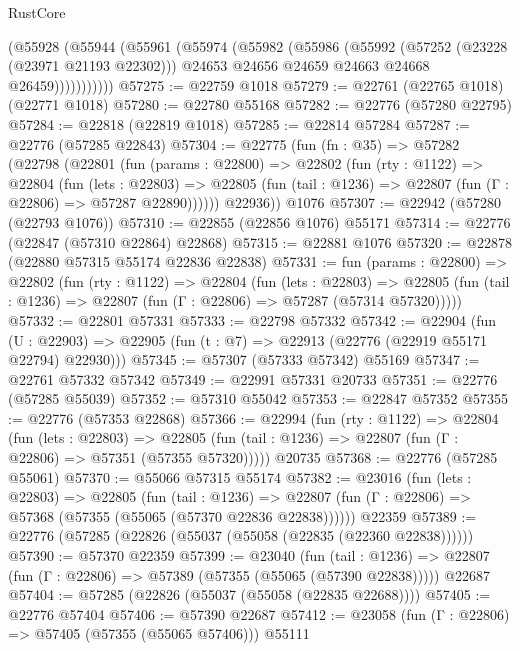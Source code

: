 \begin{lexlean}{RustCore}
\begin{coremodule}
            (@55928
              (@55944
                (@55961
                  (@55974
                    (@55982
                      (@55986
                        (@55992
                          (@57252 (@23228 (@23971 @21193 @22302)))
                          @24653
                          @24656
                          @24659
                          @24663
                          @24668
                          @26459)))))))))))
@57275 := @22759 @1018
@57279 := @22761 (@22765 @1018) (@22771 @1018)
@57280 := @22780 @55168
@57282 := @22776 (@57280 @22795)
@57284 := @22818 (@22819 @1018)
@57285 := @22814 @57284
@57287 := @22776 (@57285 @22843)
@57304 := @22775
    (fun (fn : @35) =>
    @57282
      (@22798
        (@22801
          (fun (params : @22800) =>
          @22802
            (fun (rty : @1122) =>
            @22804
              (fun (lets : @22803) =>
              @22805 (fun (tail : @1236) => @22807 (fun (Γ : @22806) => @57287 @22890))))))
        @22936))
    @1076
@57307 := @22942 (@57280 (@22793 @1076))
@57310 := @22855 (@22856 @1076) @55171
@57314 := @22776 (@22847 (@57310 @22864) @22868)
@57315 := @22881 @1076
@57320 := @22878 (@22880 @57315 @55174 @22836 @22838)
@57331 := fun (params : @22800) =>
  @22802
    (fun (rty : @1122) =>
    @22804
      (fun (lets : @22803) =>
      @22805 (fun (tail : @1236) => @22807 (fun (Γ : @22806) => @57287 (@57314 @57320)))))
@57332 := @22801 @57331
@57333 := @22798 @57332
@57342 := @22904
    (fun (U : @22903) => @22905 (fun (t : @7) => @22913 (@22776 (@22919 @55171 @22794) @22930)))
@57345 := @57307 (@57333 @57342) @55169
@57347 := @22761 @57332 @57342
@57349 := @22991 @57331 @20733
@57351 := @22776 (@57285 @55039)
@57352 := @57310 @55042
@57353 := @22847 @57352
@57355 := @22776 (@57353 @22868)
@57366 := @22994
    (fun (rty : @1122) =>
    @22804
      (fun (lets : @22803) =>
      @22805 (fun (tail : @1236) => @22807 (fun (Γ : @22806) => @57351 (@57355 @57320)))))
    @20735
@57368 := @22776 (@57285 @55061)
@57370 := @55066 @57315 @55174
@57382 := @23016
    (fun (lets : @22803) =>
    @22805
      (fun (tail : @1236) =>
      @22807 (fun (Γ : @22806) => @57368 (@57355 (@55065 (@57370 @22836 @22838))))))
    @22359
@57389 := @22776 (@57285 (@22826 (@55037 (@55058 (@22835 (@22360 @22838))))))
@57390 := @57370 @22359
@57399 := @23040
    (fun (tail : @1236) => @22807 (fun (Γ : @22806) => @57389 (@57355 (@55065 (@57390 @22838)))))
    @22687
@57404 := @57285 (@22826 (@55037 (@55058 (@22835 @22688))))
@57405 := @22776 @57404
@57406 := @57390 @22687
@57412 := @23058 (fun (Γ : @22806) => @57405 (@57355 (@55065 @57406))) @55111

\end{coremodule}
\end{lexlean}

